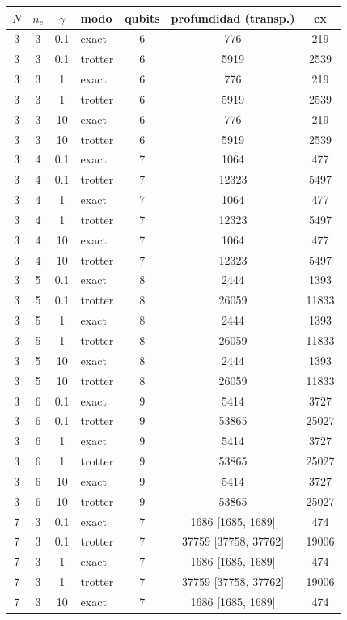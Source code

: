 \begin{tabular}{ccclccc}
\hline
$N$ & $n_c$ & $\gamma$ & modo & qubits & profundidad (transp.) & cx \\
\hline
3 & 3 & 0.1 & exact & 6 & 776 & 219 \\
3 & 3 & 0.1 & trotter & 6 & 5919 & 2539 \\
3 & 3 & 1 & exact & 6 & 776 & 219 \\
3 & 3 & 1 & trotter & 6 & 5919 & 2539 \\
3 & 3 & 10 & exact & 6 & 776 & 219 \\
3 & 3 & 10 & trotter & 6 & 5919 & 2539 \\
3 & 4 & 0.1 & exact & 7 & 1064 & 477 \\
3 & 4 & 0.1 & trotter & 7 & 12323 & 5497 \\
3 & 4 & 1 & exact & 7 & 1064 & 477 \\
3 & 4 & 1 & trotter & 7 & 12323 & 5497 \\
3 & 4 & 10 & exact & 7 & 1064 & 477 \\
3 & 4 & 10 & trotter & 7 & 12323 & 5497 \\
3 & 5 & 0.1 & exact & 8 & 2444 & 1393 \\
3 & 5 & 0.1 & trotter & 8 & 26059 & 11833 \\
3 & 5 & 1 & exact & 8 & 2444 & 1393 \\
3 & 5 & 1 & trotter & 8 & 26059 & 11833 \\
3 & 5 & 10 & exact & 8 & 2444 & 1393 \\
3 & 5 & 10 & trotter & 8 & 26059 & 11833 \\
3 & 6 & 0.1 & exact & 9 & 5414 & 3727 \\
3 & 6 & 0.1 & trotter & 9 & 53865 & 25027 \\
3 & 6 & 1 & exact & 9 & 5414 & 3727 \\
3 & 6 & 1 & trotter & 9 & 53865 & 25027 \\
3 & 6 & 10 & exact & 9 & 5414 & 3727 \\
3 & 6 & 10 & trotter & 9 & 53865 & 25027 \\
7 & 3 & 0.1 & exact & 7 & 1686 [1685, 1689] & 474 \\
7 & 3 & 0.1 & trotter & 7 & 37759 [37758, 37762] & 19006 \\
7 & 3 & 1 & exact & 7 & 1686 [1685, 1689] & 474 \\
7 & 3 & 1 & trotter & 7 & 37759 [37758, 37762] & 19006 \\
7 & 3 & 10 & exact & 7 & 1686 [1685, 1689] & 474 \\

\end{tabular}
